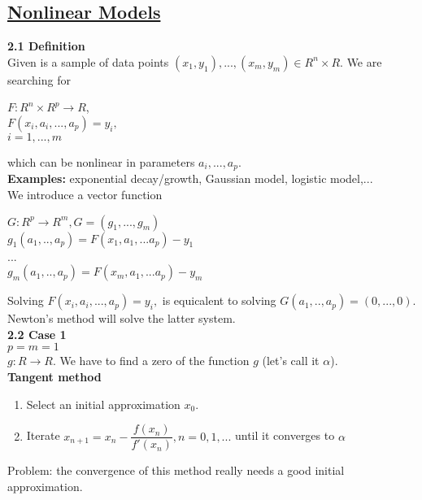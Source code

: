 \documentclass{article}
\begin{document}
\begin{multicols}{3}
\section{\underline{Nonlinear Models}}

\textbf{2.1 Definition}\\
Given is a sample of data points $(x_1, y_1),...,(x_m, y_m) \in R^n \times R$.
We are searching for
\begin{center}
$F: R^n \times R^p \rightarrow R$, \\
$F(x_i, a_i, ..., a_p) = y_i,$ \\
$i = 1,...,m$
\end{center}
which can be nonlinear in parameters $a_i,...,a_p$. \\
\textbf{Examples:} exponential decay/growth, Gaussian model, logistic model,...\\

We introduce a vector function 
\begin{center}
$G: R^p \rightarrow R^m, G = (g_1,...,g_m)$\\
$g_1(a_1,..,a_p) = F(x_1,a_1,...a_p) - y_1$\\
...\\
$g_m(a_1,..,a_p) = F(x_m,a_1,...a_p) - y_m$
\end{center}

Solving $F(x_i, a_i, ..., a_p) = y_i,$ is equicalent to solving $G(a_1,..,a_p) = (0,...,0)$. 
Newton's method will solve the latter system.\\

\textbf{2.2 Case 1}\\
$p = m = 1$\\
$g: R \rightarrow R$. We have to find a zero of the function $g$ (let's call it $\alpha$).\\
\textbf{Tangent method}
\begin{enumerate}
    \item Select an initial approximation $x_0$.
    \item Iterate $x_{n+1} = x_n - \dfrac{f(x_n)}{f'(x_n)}, n=0,1,...$ until it converges to $\alpha$
\end{enumerate}
Problem: the convergence of this method really needs a good initial approximation.

\end{multicols}
\end{document}
